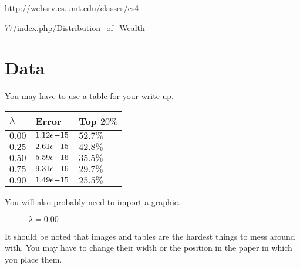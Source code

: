 \documentclass{article}%
\begin{document}
    \noindent\url{http://websrv.cs.umt.edu/classes/cs4}

    \noindent\url{77/index.php/Distribution_of_Wealth}

    \section{Data}
    You may have to use a table for your write up.
    \begin{table}[h]%
            \centering
                    \begin{tabular}{| l | l | l |}
                            \hline
                            $\lambda$	&	Error									&	Top $20\%$\\
                            \hline
                            $0.00$		&	$1.12\normalfont{e-}15$	&	$52.7\%$\\
                            $0.25$		&	$2.61\normalfont{e-}15$	&	$42.8\%$\\
                            $0.50$		&	$5.59\normalfont{e-}16$	&	$35.5\%$\\
                            $0.75$		&	$9.31\normalfont{e-}16$	&	$29.7\%$\\
                            $0.90$		&	$1.49\normalfont{e-}15$	&	$25.5\%$\\
                            \hline			
                    \end{tabular}
    \end{table}

    You will also probably need to import a graphic.
    \begin{figure}[h]%
            \centering
            \label{fig:fig01} %
            \caption{$\lambda = 0.00$}%
    \end{figure}
    It should be noted that images and tables are the hardest things to mess around with. You may have to change their width or the position in the paper in which you place them.
\end{document}

